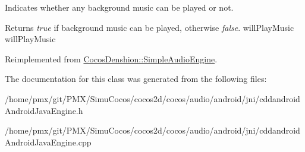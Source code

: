Indicates whether any background music can be played or not.

\begin{DoxyReturn}{Returns}
{\itshape true} if background music can be played, otherwise {\itshape false}.  will\+Play\+Music  will\+Play\+Music 
\end{DoxyReturn}


Reimplemented from \hyperlink{classCocosDenshion_1_1SimpleAudioEngine_af2a5eb0c4a7127c62a0c61dfd285d076}{Cocos\+Denshion\+::\+Simple\+Audio\+Engine}.



The documentation for this class was generated from the following files\+:\begin{DoxyCompactItemize}
\item 
/home/pmx/git/\+P\+M\+X/\+Simu\+Cocos/cocos2d/cocos/audio/android/jni/cddandroid\+Android\+Java\+Engine.\+h\item 
/home/pmx/git/\+P\+M\+X/\+Simu\+Cocos/cocos2d/cocos/audio/android/jni/cddandroid\+Android\+Java\+Engine.\+cpp\end{DoxyCompactItemize}
